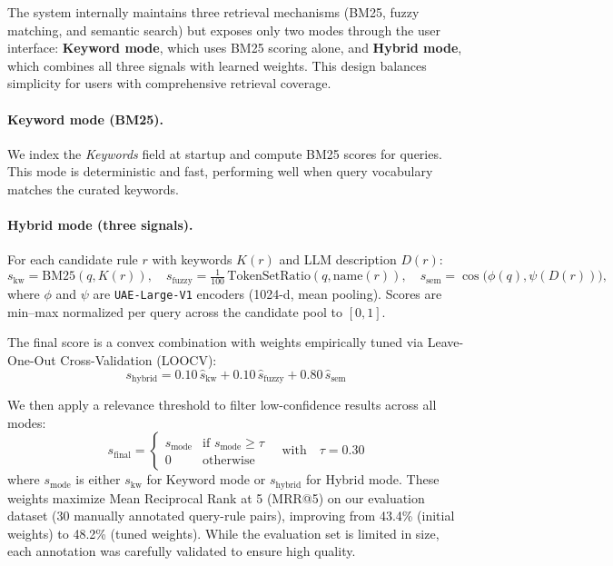 The system internally maintains three retrieval mechanisms (BM25, fuzzy matching, and semantic search) but exposes only two modes through the user interface: \textbf{Keyword mode}, which uses BM25 scoring alone, and \textbf{Hybrid mode}, which combines all three signals with learned weights. This design balances simplicity for users with comprehensive retrieval coverage.

\paragraph{Keyword mode (BM25).} 
We index the \emph{Keywords} field at startup and compute BM25 scores for queries. This mode is deterministic and fast, performing well when query vocabulary matches the curated keywords.

\paragraph{Hybrid mode (three signals).} 
For each candidate rule $r$ with keywords $K(r)$ and LLM description $D(r)$:
\[
s_{\text{kw}} = \mathrm{BM25}(q, K(r)),\quad s_{\text{fuzzy}} = \tfrac{1}{100}\,\mathrm{TokenSetRatio}(q, \mathrm{name}(r)),\quad s_{\text{sem}} = \cos\!\big(\phi(q), \psi(D(r))\big),
\]
where $\phi$ and $\psi$ are \texttt{UAE-Large-V1} encoders (1024-d, mean pooling). Scores are min–max normalized per query across the candidate pool to $[0,1]$. 

The final score is a convex combination with weights empirically tuned via Leave-One-Out Cross-Validation (LOOCV):
\[
s_{\text{hybrid}} = 0.10\,\widehat{s}_{\text{kw}} + 0.10\,\widehat{s}_{\text{fuzzy}} + 0.80\,\widehat{s}_{\text{sem}}
\]

We then apply a relevance threshold to filter low-confidence results across all modes:
\[
\boxed{ \; s_{\text{final}} = \begin{cases}
s_{\text{mode}} & \text{if } s_{\text{mode}} \ge \tau \\
0 & \text{otherwise}
\end{cases}
\quad \text{with} \quad \tau = 0.30 \; }
\]
where $s_{\text{mode}}$ is either $s_{\text{kw}}$ for Keyword mode or $s_{\text{hybrid}}$ for Hybrid mode. These weights maximize Mean Reciprocal Rank at 5 (MRR@5) on our evaluation dataset (30 manually annotated query-rule pairs), improving from 43.4\% (initial weights) to 48.2\% (tuned weights). While the evaluation set is limited in size, each annotation was carefully validated to ensure high quality.

